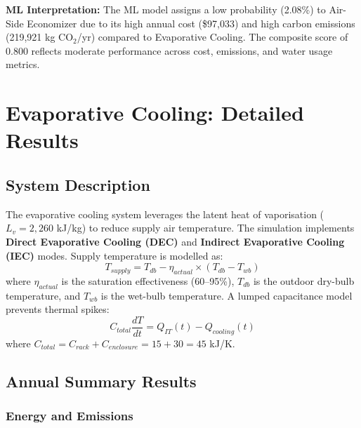 \documentclass[12pt,a4paper]{report}
\begin{document}
\noindent\textbf{ML Interpretation:} The ML model assigns a low probability (2.08\%) to Air-Side Economizer
due to its high annual cost (\$97{,}033) and high carbon emissions (219{,}921 kg CO$_2$/yr) compared to
Evaporative Cooling. The composite score of 0.800 reflects moderate performance across cost, emissions,
and water usage metrics.

\newpage

\chapter{Evaporative Cooling: Detailed Results}
\label{ch:evap}

\section{System Description}

The evaporative cooling system leverages the latent heat of vaporisation ($L_v = 2{,}260$ kJ/kg)
to reduce supply air temperature. The simulation implements \textbf{Direct Evaporative Cooling (DEC)}
and \textbf{Indirect Evaporative Cooling (IEC)} modes. Supply temperature is modelled as:
\begin{equation}
T_{supply} = T_{db} - \eta_{actual} \times (T_{db} - T_{wb})
\label{eq:evap_supply}
\end{equation}
where $\eta_{actual}$ is the saturation effectiveness (60--95\%), $T_{db}$ is the outdoor dry-bulb
temperature, and $T_{wb}$ is the wet-bulb temperature. A lumped capacitance model prevents thermal spikes:
\begin{equation}
C_{total}\frac{dT}{dt} = Q_{IT}(t) - Q_{cooling}(t)
\label{eq:evap_thermal_mass}
\end{equation}
where $C_{total} = C_{rack} + C_{enclosure} = 15 + 30 = 45$ kJ/K.

\section{Annual Summary Results}

\subsection{Energy and Emissions}
\end{document}
